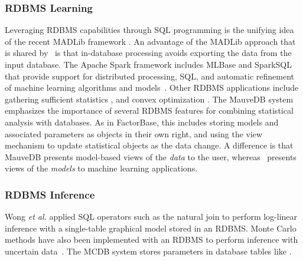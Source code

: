 \subsubsection{RDBMS Learning}
Leveraging RDBMS capabilities through SQL programming 
is the unifying idea of the recent MADLib framework \cite{MADlib_VLDB_2012}. An advantage of the MADLib approach that is shared by \FB\ is that in-database processing avoids exporting the data from the input database. The Apache Spark \cite{Committers} framework includes MLBase and SparkSQL that provide support for distributed processing, SQL, and automatic refinement of machine learning algorithms and models~\cite{MLbase_ICDR_2013}.
Other RDBMS applications include gathering sufficient statistics \cite{Graefe1998}, and convex optimization \cite{Feng_SIGMOD_2012}. The MauveDB system \cite{Deshpande2006} emphasizes the importance of several RDBMS features for combining statistical analysis with databases.
As in {\sc FactorBase}, this includes 
storing models and associated parameters as objects in their own right, 
and using the view mechanism to update statistical objects as the data change.
A difference is that
MauveDB presents model-based views of the {\em data} to the user, whereas \FB\ presents views of the {\em models} to machine learning applications. 

\subsubsection{RDBMS Inference}
Wong {\em et al.}  applied SQL operators such as the natural join to perform log-linear inference with a single-table graphical model \cite{Wong1995} stored in an RDBMS. 
Monte Carlo methods have also been implemented with an RDBMS  to perform inference with uncertain data~\cite{MCDB_SIGMOD_2008,Wick_VLDB_2010}.
The MCDB system \cite{MCDB_SIGMOD_2008}  stores parameters in database tables like \FB. 
%


